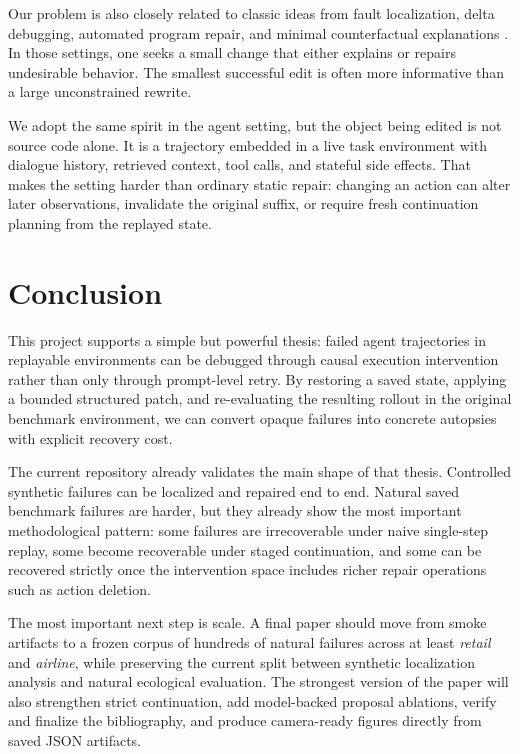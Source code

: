 \documentclass[11pt]{article}
\begin{document}
Our problem is also closely related to classic ideas from fault localization,
delta debugging, automated program repair, and minimal counterfactual
explanations \citep{delta_debugging,program_repair,minimal_counterfactuals}.
In those settings, one seeks a small change that either explains or repairs
undesirable behavior. The smallest successful edit is often more informative
than a large unconstrained rewrite.

We adopt the same spirit in the agent setting, but the object being edited is
not source code alone. It is a trajectory embedded in a live task environment
with dialogue history, retrieved context, tool calls, and stateful side
effects. That makes the setting harder than ordinary static repair: changing an
action can alter later observations, invalidate the original suffix, or require
fresh continuation planning from the replayed state.

\section{Conclusion}

This project supports a simple but powerful thesis: failed agent trajectories
in replayable environments can be debugged through causal execution
intervention rather than only through prompt-level retry. By restoring a saved
state, applying a bounded structured patch, and re-evaluating the resulting
rollout in the original benchmark environment, we can convert opaque failures
into concrete autopsies with explicit recovery cost.

The current repository already validates the main shape of that thesis.
Controlled synthetic failures can be localized and repaired end to end.
Natural saved benchmark failures are harder, but they already show the most
important methodological pattern: some failures are irrecoverable under naive
single-step replay, some become recoverable under staged continuation, and some
can be recovered strictly once the intervention space includes richer repair
operations such as action deletion.

The most important next step is scale. A final paper should move from smoke
artifacts to a frozen corpus of hundreds of natural failures across at least
\textit{retail} and \textit{airline}, while preserving the current split
between synthetic localization analysis and natural ecological evaluation. The
strongest version of the paper will also strengthen strict continuation, add
model-backed proposal ablations, verify and finalize the bibliography, and
produce camera-ready figures directly from saved JSON artifacts.



\end{document}
